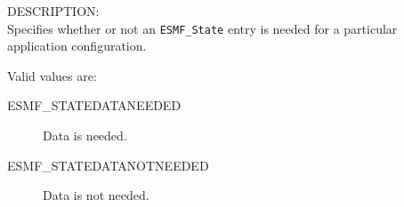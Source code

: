 {\sf DESCRIPTION:\\}
Specifies whether or not an {\tt ESMF\_State} entry is needed for a 
particular application configuration.

Valid values are:
\begin{description}
   \item [ESMF\_STATEDATANEEDED] 
         Data is needed.
   \item [ESMF\_STATEDATANOTNEEDED]
         Data is not needed.
\end{description}






